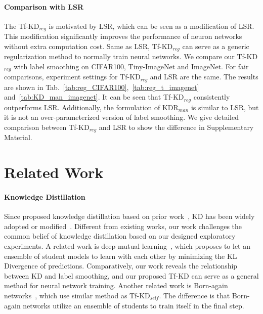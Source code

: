 \documentclass[10pt,twocolumn,letterpaper]{article}
\begin{document}
\paragraph{Comparison with LSR} The Tf-KD$_{reg}$ is motivated by LSR, which can be seen as a modification of LSR. This modification significantly improves the performance of neuron networks without extra computation cost. Same as LSR, Tf-KD$_{reg}$ can serve as a generic regularization method to normally train neural networks. We compare our Tf-KD$_{reg}$ with label smoothing on CIFAR100, Tiny-ImageNet and ImageNet. For fair comparisons, experiment settings for Tf-KD$_{reg}$ and LSR are the same. The results are shown in Tab.~\ref{tab:reg_CIFAR100},~\ref{tab:reg_t_imagenet} and~\ref{tab:KD_man_imagenet}. It can be seen that Tf-KD$_{reg}$ consistently outperforms LSR. Additionally, the formulation of KDR$_{man}$ is similar to LSR, but it is not an over-parameterized version of label smoothing. We give detailed comparison between Tf-KD$_{reg}$ and LSR to show the difference in Supplementary Material.

\section{Related Work}
\vspace{-5pt}
\paragraph{Knowledge Distillation} Since \cite{hinton2015distilling} proposed knowledge distillation based on prior work~\cite{ba2014deep}, KD has been widely adopted or modified~\cite{romero2014fitnets,yim2017gift,yu2017visual,furlanello2018born, anil2018large, mirzadeh2019improved, Wang_2019_CVPR}. Different from existing works, our work challenges the common belief of knowledge distillation based on our designed exploratory experiments. A related work is deep mutual learning~\cite{zhang2018deep}, which proposes to let an ensemble of student models to learn with each other by minimizing the KL Divergence of predictions. Comparatively, our work reveals the relationship between KD and label smoothing, and our proposed Tf-KD can serve as a general method for neural network training. Another related work is Born-again networks~\cite{furlanello2018born}, which use similar method as Tf-KD$_{self}$. The difference is that Born-again networks utilize an ensemble of students to train itself in the final step. %
\end{document}
